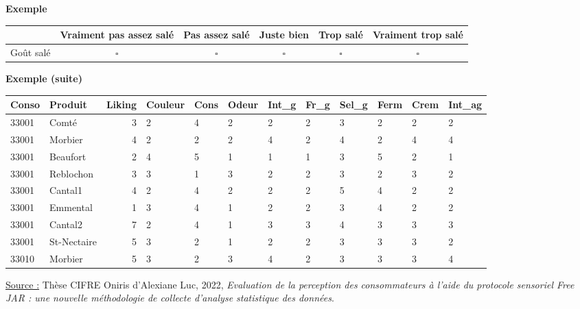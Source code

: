 \documentclass[aspectratio=169,xcolor=dvipsnames]{beamer}
\begin{document}
\begin{frame}
\begin{exampleblock}{\textbf{Exemple}}
\begin{itemize}
\begin{scriptsize}
				\begin{tabular}{cccccc}
				 & Vraiment pas assez salé & Pas assez salé & Juste bien & Trop salé & Vraiment trop salé \\
				 \hline
				Goût salé & $\square$ & $\square$ & $\square$ & $\square$ & $\square$ 
				\end{tabular}
			\end{scriptsize}
		\end{itemize}
	\end{exampleblock}
\end{frame}

\begin{frame}
	\begin{exampleblock}{\textbf{Exemple (suite)}}
\begin{scriptsize}
\begin{center}
\begin{tabular}{llrlllllllll}
  \hline
Conso & Produit & Liking & Couleur & Cons & Odeur & Int\_g & Fr\_g & Sel\_g & Ferm & Crem & Int\_ag \\ 
  \hline
33001 & Comté &   3 & 2 & 4 & 2 & 2 & 2 & 3 & 2 & 2 & 2 \\ 
33001 & Morbier &   4 & 2 & 2 & 2 & 4 & 2 & 4 & 2 & 4 & 4 \\ 
33001 & Beaufort &   2 & 4 & 5 & 1 & 1 & 1 & 3 & 5 & 2 & 1 \\ 
33001 & Reblochon &   3 & 3 & 1 & 3 & 2 & 2 & 3 & 2 & 3 & 2 \\ 
33001 & Cantal1 &   4 & 2 & 4 & 2 & 2 & 2 & 5 & 4 & 2 & 2 \\ 
33001 & Emmental &   1 & 3 & 4 & 1 & 2 & 2 & 3 & 4 & 2 & 2 \\ 
33001 & Cantal2 &   7 & 2 & 4 & 1 & 3 & 3 & 4 & 3 & 3 & 3 \\ 
33001 & St-Nectaire &   5 & 3 & 2 & 1 & 2 & 2 & 3 & 3 & 3 & 2 \\ 
33010 & Morbier &   5 & 3 & 2 & 3 & 4 & 2 & 3 & 3 & 3 & 4 \\ 
   \hline
\end{tabular}
\end{center}

\underline{Source :} Thèse CIFRE Oniris  d'Alexiane Luc, 2022, \emph{Evaluation de la perception des consommateurs à l'aide du protocole
sensoriel Free JAR : une nouvelle méthodologie de collecte d'analyse
statistique des données}.
\end{scriptsize}
	\end{exampleblock}
\end{frame}
\end{document}

